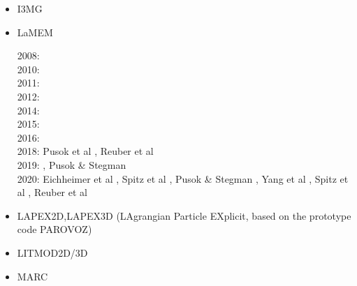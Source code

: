 \begin{itemize}
\item I3MG

{\small
\noindent
\cite{facc14}
}

\item LaMEM 

\begin{scriptsize}
2008: \cite{scbe08}\\
2010: \cite{kamm10}\\
2011: \cite{lemk11}\\
2012: \cite{may12}\\
2014: \cite{lesh14}\cite{cokm14}\cite{bakp14}\cite{feka14a}\cite{feka14b}\\
2015: \cite{puka15}\cite{feka15}\cite{cofk15}\\
2016: \cite{kapb16}\cite{coyc16}\\
2018: Pusok et al \cite{pukp18}, Reuber et al \cite{rekp18}\\
2019: \cite{eitp19}\cite{hooi19}, Pusok \& Stegman \cite{pust19}\\
2020: Eichheimer et al \cite{eitf20}, Spitz et al \cite{spsk20}, Pusok \& Stegman \cite{pust20}, 
      Yang et al \cite{yakl20}, Spitz et al \cite{spbe20}, Reuber et al \cite{rehp20}
\end{scriptsize}

\item LAPEX2D,LAPEX3D  (LAgrangian Particle EXplicit, based on the prototype code PAROVOZ) 

\begin{scriptsize}
\cite{sopg05}\cite{baso05}\cite{soba05}
\cite{bube06}\cite{basv06}\cite{sobk06}\cite{peso06}
\cite{peso08}\cite{baso08}\cite{scbe08}
\cite{sosk11}
\end{scriptsize}

\item LITMOD2D/3D

{\small 
\noindent
\cite{afrf07}
\cite{affr08}
\cite{fuac09}
\cite{fufa10}
\cite{jitf19}
}

\item MARC


\end{itemize}
